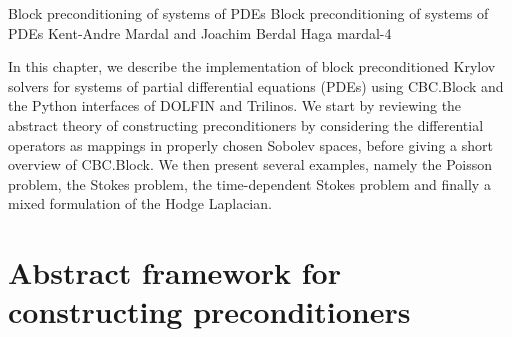               {Block preconditioning of systems of PDEs}
              {Block preconditioning of systems of PDEs}
              {Kent-Andre Mardal and Joachim Berdal Haga}
              {mardal-4}

\newcommand{\algorithmexample}[3]{%
\begin{figure}
  \small
  \begin{tabular}{l}
    \toprule
    \textbf{Algorithm example #1:} #2 \\
    \midrule
    \begin{minipage}{0.9\textwidth}
      \vspace{0.1cm}
      \begin{enumerate}
        #3
      \end{enumerate}
      \vspace{0.1cm}
    \end{minipage} \\
    \bottomrule
  \end{tabular}
  \normalsize
\end{figure}}


\newcommand{\mop}[1]{\operatorname{#1}}

In this chapter, we describe the implementation of block
preconditioned Krylov solvers for systems of partial differential
equations (PDEs) using CBC.Block and the
Python interfaces of DOLFIN and Trilinos. We start
by reviewing the abstract theory of constructing
preconditioners by considering the differential
operators as mappings in properly chosen Sobolev spaces, before giving
a short overview of CBC.Block. We then present several examples,
namely the Poisson problem, the Stokes problem, the time-dependent
Stokes problem and finally a mixed formulation of the Hodge Laplacian.

\section{Abstract framework for constructing preconditioners}

